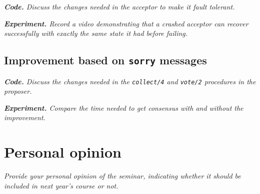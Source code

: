 \documentclass[a4paper, 10pt]{article}
\begin{document}
\textit{\textbf{Code.} Discuss the changes needed in the acceptor to make it fault tolerant.}

{\setlength{\parskip}{10pt}\noindent\textit{\textbf{Experiment.} Record a video demonstrating that a crashed acceptor can recover successfully with exactly the same state it had before failing.}}

\subsection{Improvement based on \texttt{sorry} messages}

\textit{\textbf{Code.} Discuss the changes needed in the \texttt{collect/4} and \texttt{vote/2} procedures in the proposer.}
 
{\setlength{\parskip}{10pt}\noindent\textit{\textbf{Experiment.} Compare the time needed to get consensus with and without the improvement.}}

\section{Personal opinion}

\textit{Provide your personal opinion of the seminar, indicating whether it should be included in next year's course or not.}
\end{document}
